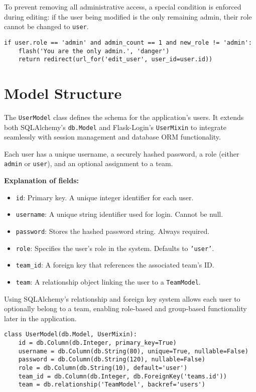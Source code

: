 \documentclass[12pt]{article}
\begin{document}
To prevent removing all administrative access, a special condition is enforced during editing: if the user being modified is the only remaining admin, their role cannot be changed to \texttt{user}.

\begin{verbatim}
if user.role == 'admin' and admin_count == 1 and new_role != 'admin':
    flash('You are the only admin.', 'danger')
    return redirect(url_for('edit_user', user_id=user.id))
\end{verbatim}


\section{Model Structure}

The \texttt{UserModel} class defines the schema for the application's users. It extends both SQLAlchemy’s \texttt{db.Model} and Flask-Login’s \texttt{UserMixin} to integrate seamlessly with session management and database ORM functionality.

Each user has a unique username, a securely hashed password, a role (either \texttt{admin} or \texttt{user}), and an optional assignment to a team.

\textbf{Explanation of fields:}
\begin{itemize}
  \item \texttt{id}: Primary key. A unique integer identifier for each user.
  \item \texttt{username}: A unique string identifier used for login. Cannot be null.
  \item \texttt{password}: Stores the hashed password string. Always required.
  \item \texttt{role}: Specifies the user's role in the system. Defaults to \texttt{'user'}.
  \item \texttt{team\_id}: A foreign key that references the associated team’s ID.
  \item \texttt{team}: A relationship object linking the user to a \texttt{TeamModel}.
\end{itemize}

\noindent Using SQLAlchemy’s relationship and foreign key system allows each user to optionally belong to a team, enabling role-based and group-based functionality later in the application.

\begin{verbatim}
class UserModel(db.Model, UserMixin):
    id = db.Column(db.Integer, primary_key=True) 
    username = db.Column(db.String(80), unique=True, nullable=False) 
    password = db.Column(db.String(120), nullable=False)  
    role = db.Column(db.String(10), default='user') 
    team_id = db.Column(db.Integer, db.ForeignKey('teams.id')) 
    team = db.relationship('TeamModel', backref='users') 
\end{verbatim}
\end{document}
